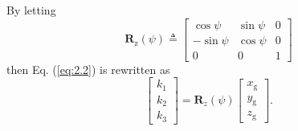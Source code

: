 By letting
\begin{equation}
{{\mathbf{R}}_{\text{z}}}\left(\psi\right)\triangleq\left[\begin{array}{ccc}
\cos\psi & \sin\psi & 0\\
-\sin\psi & \cos\psi & 0\\
0 & 0 & 1
\end{array}\right]\label{eq:2.3}
\end{equation}
then Eq. (\ref{eq:2.2}) is rewritten as 
\begin{equation}
\left[\begin{array}{l}
{k_{1}}\\
{k_{2}}\\
{k_{3}}
\end{array}\right]={\mathbf{R}_{z}}\left(\psi\right)\left[{\begin{array}{c}
	{x_{\text{g}}}\\
	{y_{\text{g}}}\\
	{z_{\text{g}}}
	\end{array}}\right].\label{eq:2.4}
\end{equation}

